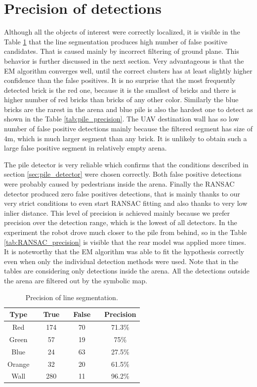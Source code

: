 \section{Precision of detections}
Although all the objects of interest were correctly localized, it is visible in the Table \ref{tab:seg_precision} that the line segmentation produces high number of false positive candidates. That is caused mainly by incorrect filtering of ground plane. This behavior is further discussed in the next section. Very advantageous is that the EM algorithm converges well, until the correct clusters has at least slightly higher confidence than the false positives. It is no surprise that the most frequently detected brick is the red one, because it is the smallest of bricks and there is higher number of red bricks than bricks of any other color. Similarly the blue bricks are the rarest in the arena and blue pile is also the hardest one to detect as shown in the Table \ref{tab:pile_precision}. The UAV destination wall has so low number of false positive detections mainly because the filtered segment has size of $4$m, which is much larger segment than any brick. It is unlikely to obtain such a large false positive segment in relatively empty arena.

The pile detector is very reliable which confirms that the conditions described in section \ref{sec:pile_detector} were chosen correctly. Both false positive detections were probably caused by pedestrians inside the arena. Finally the RANSAC detector produced zero false positives detections, that is mainly thanks to our very strict conditions to even start RANSAC fitting and also thanks to very low inlier distance. This level of precision is achieved mainly because we prefer precision over the detection range, which is the lowest of all detectors. In the experiment the robot drove much closer to the pile from behind, so in the Table \ref{tab:RANSAC_precision} is visible that the rear model was applied more times. It is noteworthy that the EM algorithm was able to fit the hypothesis correctly even when only the individual detection methods were used. Note that in the tables are considering only detections inside the arena. All the detections outside the arena are filtered out by the symbolic map.

\begin{table}[H]
	\centering
	\begin{tabular}{ccccccc}
		\toprule
		Type &\quad& True &\quad& False &\quad& Precision \\
		\midrule
		Red &\quad& 174 &\quad& 70 &\quad&71.3\% \\
		Green &\quad& 57 &\quad& 19 &\quad& 75\% \\
		Blue &\quad& 24 &\quad& 63 &\quad& 27.5\% \\
		Orange &\quad& 32 &\quad& 20 &\quad& 61.5\% \\
		Wall &\quad& 280 &\quad& 11 &\quad& 96.2\% \\
		\bottomrule
	\end{tabular}
	\caption{Precision of line segmentation.}
	\label{tab:seg_precision}
\end{table}


